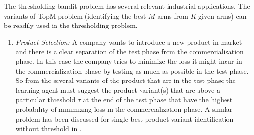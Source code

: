 The thresholding bandit problem has several relevant industrial applications. The variants of TopM problem (identifying the best $M$ arms from $K$ given arms) can be readily used in the thresholding problem.

\begin{enumerate}
\item \emph{Product Selection:} A company wants to introduce a new product in market and there is a clear separation of the test phase from the commercialization phase. In this case the company tries to minimize the loss it might incur in the commercialization phase by testing as much as possible in the test phase. So from the several variants of the product that are in the test phase the learning agent must suggest the product variant(s) that are above a particular threshold $\tau$ at the end of the test phase that have the highest probability of minimizing loss in the commercialization phase. A similar problem has been discussed for single best product variant identification without threshold in \cite{bubeck2011pure}. 

\end{enumerate}
